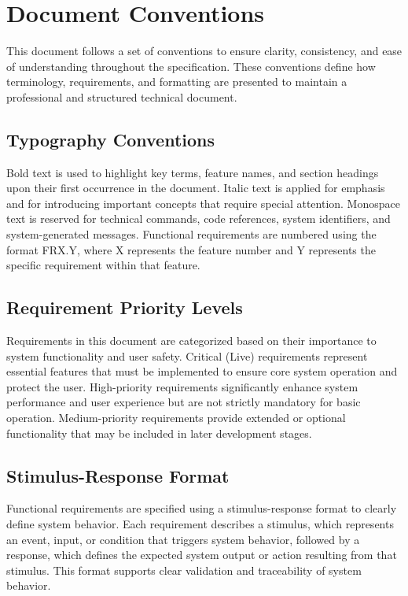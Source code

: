 \section{Document Conventions}

This document follows a set of conventions to ensure clarity, consistency, and ease of understanding throughout the specification. These conventions define how terminology, requirements, and formatting are presented to maintain a professional and structured technical document.

\subsection{Typography Conventions}

Bold text is used to highlight key terms, feature names, and section headings upon their first occurrence in the document. Italic text is applied for emphasis and for introducing important concepts that require special attention. Monospace text is reserved for technical commands, code references, system identifiers, and system-generated messages. Functional requirements are numbered using the format FRX.Y, where X represents the feature number and Y represents the specific requirement within that feature.

\subsection{Requirement Priority Levels}

Requirements in this document are categorized based on their importance to system functionality and user safety. Critical (Live) requirements represent essential features that must be implemented to ensure core system operation and protect the user. High-priority requirements significantly enhance system performance and user experience but are not strictly mandatory for basic operation. Medium-priority requirements provide extended or optional functionality that may be included in later development stages.

\subsection{Stimulus-Response Format}

Functional requirements are specified using a stimulus-response format to clearly define system behavior. Each requirement describes a stimulus, which represents an event, input, or condition that triggers system behavior, followed by a response, which defines the expected system output or action resulting from that stimulus. This format supports clear validation and traceability of system behavior.

